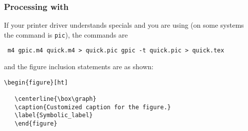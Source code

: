 \subsubsection{Processing with \gpic\label{Processingwithgpic:}}
If your printer driver understands \tpic specials and
you are using \gpic  (on some systems the \gpic command is {\tt pic}),
the commands are

  {\tt
  m4 gpic.m4 quick.m4 > quick.pic
    \brtt
  gpic -t quick.pic > quick.tex
   \vspace*\parsep}

\noindent
and the figure inclusion statements are as shown:
\begin{verbatim}
\begin{figure}[ht]
   
   \centerline{\box\graph}
   \caption{Customized caption for the figure.}
   \label{Symbolic_label}
   \end{figure}
\end{verbatim}

